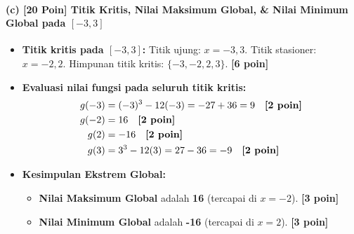 \documentclass[11pt,a4paper]{article}
\begin{document}
\paragraph{(c) [20 Poin] Titik Kritis, Nilai Maksimum Global, \& Nilai Minimum Global pada $[-3, 3]$}
\begin{itemize}[leftmargin=18pt]
    \item \textbf{Titik kritis pada $[-3, 3]$:}
    Titik ujung: $x = -3, 3$. Titik stasioner: $x = -2, 2$. Himpunan titik kritis: $\{-3, -2, 2, 3\}$. \textbf{[6 poin]}
    \item \textbf{Evaluasi nilai fungsi pada seluruh titik kritis:}
    \begin{align*}
        g(-3) &= (-3)^3 - 12(-3) = -27 + 36 = 9 \quad \text{\textbf{[2 poin]}} \\
        g(-2) &= 16 \quad \text{\textbf{[2 poin]}} \\
        g(2)  &= -16 \quad \text{\textbf{[2 poin]}} \\
        g(3)  &= 3^3 - 12(3) = 27 - 36 = -9 \quad \text{\textbf{[2 poin]}}
    \end{align*}
    \item \textbf{Kesimpulan Ekstrem Global:}
    \begin{itemize}
        \item \textbf{Nilai Maksimum Global} adalah \textbf{16} (tercapai di $x = -2$). \textbf{[3 poin]}
        \item \textbf{Nilai Minimum Global} adalah \textbf{-16} (tercapai di $x = 2$). \textbf{[3 poin]}
    \end{itemize}
\end{itemize}
\end{document}
